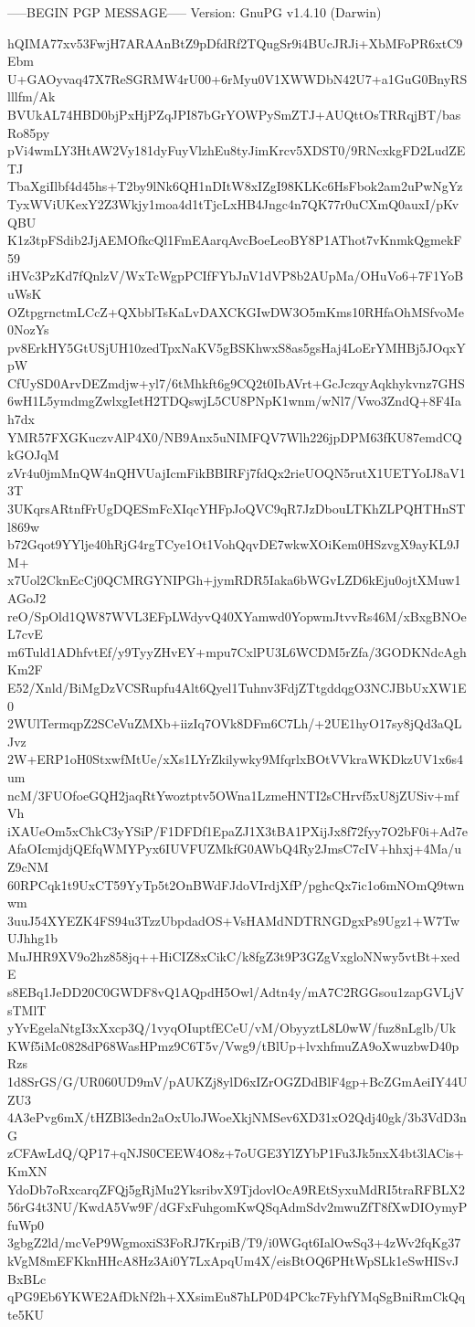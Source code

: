-----BEGIN PGP MESSAGE-----
Version: GnuPG v1.4.10 (Darwin)

hQIMA77xv53FwjH7ARAAnBtZ9pDfdRf2TQugSr9i4BUcJRJi+XbMFoPR6xtC9Ebm
U+GAOyvaq47X7ReSGRMW4rU00+6rMyu0V1XWWDbN42U7+a1GuG0BnyRSlllfm/Ak
BVUkAL74HBD0bjPxHjPZqJPI87bGrYOWPySmZTJ+AUQttOsTRRqjBT/basRo85py
pVi4wmLY3HtAW2Vy181dyFuyVlzhEu8tyJimKrcv5XDST0/9RNcxkgFD2LudZETJ
TbaXgiIlbf4d45hs+T2by9lNk6QH1nDItW8xIZgI98KLKc6HsFbok2am2uPwNgYz
TyxWViUKexY2Z3Wkjy1moa4d1tTjcLxHB4Jngc4n7QK77r0uCXmQ0auxI/pKvQBU
K1z3tpFSdib2JjAEMOfkcQl1FmEAarqAvcBoeLeoBY8P1AThot7vKnmkQgmekF59
iHVc3PzKd7fQnlzV/WxTcWgpPCIfFYbJnV1dVP8b2AUpMa/OHuVo6+7F1YoBuWsK
OZtpgrnctmLCcZ+QXbblTsKaLvDAXCKGIwDW3O5mKms10RHfaOhMSfvoMe0NozYs
pv8ErkHY5GtUSjUH10zedTpxNaKV5gBSKhwxS8as5gsHaj4LoErYMHBj5JOqxYpW
CfUySD0ArvDEZmdjw+yl7/6tMhkft6g9CQ2t0IbAVrt+GcJczqyAqkhykvnz7GHS
6wH1L5ymdmgZwlxgIetH2TDQswjL5CU8PNpK1wnm/wNl7/Vwo3ZndQ+8F4Iah7dx
YMR57FXGKuczvAlP4X0/NB9Anx5uNIMFQV7Wlh226jpDPM63fKU87emdCQkGOJqM
zVr4u0jmMnQW4nQHVUajIcmFikBBIRFj7fdQx2rieUOQN5rutX1UETYoIJ8aV13T
3UKqrsARtnfFrUgDQESmFcXIqcYHFpJoQVC9qR7JzDbouLTKhZLPQHTHnSTl869w
b72Gqot9YYlje40hRjG4rgTCye1Ot1VohQqvDE7wkwXOiKem0HSzvgX9ayKL9JM+
x7Uol2CknEcCj0QCMRGYNIPGh+jymRDR5Iaka6bWGvLZD6kEju0ojtXMuw1AGoJ2
reO/SpOld1QW87WVL3EFpLWdyvQ40XYamwd0YopwmJtvvRs46M/xBxgBNOeL7cvE
m6Tuld1ADhfvtEf/y9TyyZHvEY+mpu7CxlPU3L6WCDM5rZfa/3GODKNdcAghKm2F
E52/Xnld/BiMgDzVCSRupfu4Alt6Qyel1Tuhnv3FdjZTtgddqgO3NCJBbUxXW1E0
2WUlTermqpZ2SCeVuZMXb+iizIq7OVk8DFm6C7Lh/+2UE1hyO17sy8jQd3aQLJvz
2W+ERP1oH0StxwfMtUe/xXs1LYrZkilywky9MfqrlxBOtVVkraWKDkzUV1x6s4um
ncM/3FUOfoeGQH2jaqRtYwoztptv5OWna1LzmeHNTI2sCHrvf5xU8jZUSiv+mfVh
iXAUeOm5xChkC3yYSiP/F1DFDf1EpaZJ1X3tBA1PXijJx8f72fyy7O2bF0i+Ad7e
AfaOIcmjdjQEfqWMYPyx6IUVFUZMkfG0AWbQ4Ry2JmsC7cIV+hhxj+4Ma/uZ9cNM
60RPCqk1t9UxCT59YyTp5t2OnBWdFJdoVIrdjXfP/pghcQx7ic1o6mNOmQ9twnwm
3uuJ54XYEZK4FS94u3TzzUbpdadOS+VsHAMdNDTRNGDgxPs9Ugz1+W7TwUJhhg1b
MuJHR9XV9o2hz858jq++HiCIZ8xCikC/k8fgZ3t9P3GZgVxgloNNwy5vtBt+xedE
s8EBq1JeDD20C0GWDF8vQ1AQpdH5Owl/Adtn4y/mA7C2RGGsou1zapGVLjVsTMlT
yYvEgelaNtgI3xXxcp3Q/1vyqOIuptfECeU/vM/ObyyztL8L0wW/fuz8nLglb/Uk
KWf5iMc0828dP68WasHPmz9C6T5v/Vwg9/tBlUp+lvxhfmuZA9oXwuzbwD40pRzs
1d8SrGS/G/UR060UD9mV/pAUKZj8ylD6xIZrOGZDdBlF4gp+BcZGmAeiIY44UZU3
4A3ePvg6mX/tHZBl3edn2aOxUloJWoeXkjNMSev6XD31xO2Qdj40gk/3b3VdD3nG
zCFAwLdQ/QP17+qNJS0CEEW4O8z+7oUGE3YlZYbP1Fu3Jk5nxX4bt3lACis+KmXN
YdoDb7oRxcarqZFQj5gRjMu2YksribvX9TjdovlOcA9REtSyxuMdRI5traRFBLX2
56rG4t3NU/KwdA5Vw9F/dGFxFuhgomKwQSqAdmSdv2mwuZfT8fXwDIOymyPfuWp0
3gbgZ2ld/mcVeP9WgmoxiS3FoRJ7KrpiB/T9/i0WGqt6IalOwSq3+4zWv2fqKg37
kVgM8mEFKknHHcA8Hz3Ai0Y7LxApqUm4X/eisBtOQ6PHtWpSLk1eSwHISvJBxBLc
qPG9Eb6YKWE2AfDkNf2h+XXsimEu87hLP0D4PCkc7FyhfYMqSgBniRmCkQqte5KU
